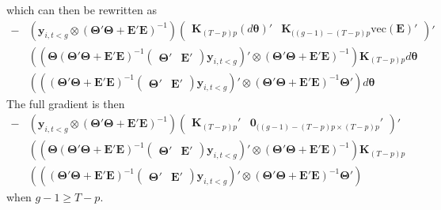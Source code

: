 which can then be rewritten as 
\begin{align}
    -&
    \left( \bm y_{i,t < g} \otimes \left( \bm \Theta' \bm \Theta + \bm E' \bm E \right)^{-1} \right)     \begin{pmatrix}
        \bm K_{(T-p)p} (d \bm \theta)' & \bm K_{((g-1) - (T-p)p} \text{vec}(\bm E)'
    \end{pmatrix}'\\
    &
    \left( \left( \bm \Theta \left( \bm \Theta' \bm \Theta + \bm E' \bm E \right)^{-1}
    \begin{pmatrix}
        \bm \Theta' & \bm E'
    \end{pmatrix}
    \bm y_{i,t < g} \right)' \otimes \left( \bm \Theta' \bm \Theta + \bm E' \bm E \right)^{-1} \right) \bm K_{(T-p)p} d \bm \theta\\
    &
    \left( \left( \left( \bm \Theta' \bm \Theta + \bm E' \bm E \right)^{-1}
    \begin{pmatrix}
        \bm \Theta' & \bm E'
    \end{pmatrix}
    \bm y_{i,t < g} \right)' \otimes \left( \bm \Theta' \bm \Theta + \bm E' \bm E \right)^{-1} \bm \Theta' \right) d \bm \theta
\end{align}
The full gradient is then 
\begin{align}
    -&
    \left( \bm y_{i,t < g} \otimes \left( \bm \Theta' \bm \Theta + \bm E' \bm E \right)^{-1} \right)     \begin{pmatrix}
        \bm K_{(T-p)p}' & \bm 0_{((g-1) - (T-p)p \times (T-p)p} '
    \end{pmatrix}'\\
    &
    \left( \left( \bm \Theta \left( \bm \Theta' \bm \Theta + \bm E' \bm E \right)^{-1}
    \begin{pmatrix}
        \bm \Theta' & \bm E'
    \end{pmatrix}
    \bm y_{i,t < g} \right)' \otimes \left( \bm \Theta' \bm \Theta + \bm E' \bm E \right)^{-1} \right) \bm K_{(T-p)p}\\
    &
    \left( \left( \left( \bm \Theta' \bm \Theta + \bm E' \bm E \right)^{-1}
    \begin{pmatrix}
        \bm \Theta' & \bm E'
    \end{pmatrix}
    \bm y_{i,t < g} \right)' \otimes \left( \bm \Theta' \bm \Theta + \bm E' \bm E \right)^{-1} \bm \Theta' \right)
\end{align}
when $g - 1 \geq T-p$. 

